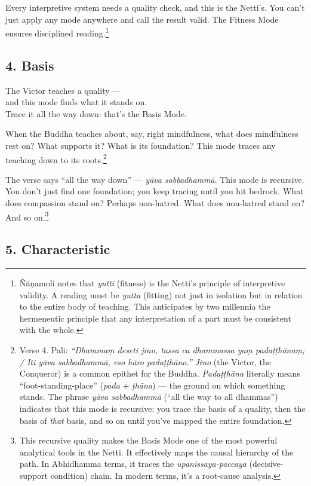 Every interpretive system needs a quality check, and this is the Netti's. You can't just apply any mode anywhere and call the result valid. The Fitness Mode ensures disciplined reading.\footnote{Ñāṇamoli notes that \textit{yutti} (fitness) is the Netti's principle of interpretive validity. A reading must be \textit{yutta} (fitting) not just in isolation but in relation to the entire body of teaching. This anticipates by two millennia the hermeneutic principle that any interpretation of a part must be consistent with the whole.}

\subsection*{4. Basis}

\begin{versebox}
The Victor teaches a quality ---\\
and this mode finds what it stands on.\\
Trace it all the way down: that's the Basis Mode.
\end{versebox}

When the Buddha teaches about, say, right mindfulness, what does mindfulness rest on? What supports it? What is its foundation? This mode traces any teaching down to its roots.\footnote{Verse 4. Pali: \textit{``Dhammaṃ deseti jino, tassa ca dhammassa yaṃ padaṭṭhānaṃ; / Iti yāva sabbadhammā, eso hāro padaṭṭhāno.''} \textit{Jino} (the Victor, the Conqueror) is a common epithet for the Buddha. \textit{Padaṭṭhāna} literally means ``foot-standing-place'' (\textit{pada} + \textit{ṭhāna}) --- the ground on which something stands. The phrase \textit{yāva sabbadhammā} (``all the way to all dhammas'') indicates that this mode is recursive: you trace the basis of a quality, then the basis of \textit{that} basis, and so on until you've mapped the entire foundation.}

The verse says ``all the way down'' --- \textit{yāva sabbadhammā}. This mode is recursive. You don't just find one foundation; you keep tracing until you hit bedrock. What does compassion stand on? Perhaps non-hatred. What does non-hatred stand on? And so on.\footnote{This recursive quality makes the Basis Mode one of the most powerful analytical tools in the Netti. It effectively maps the causal hierarchy of the path. In Abhidhamma terms, it traces the \textit{upanissaya-paccaya} (decisive-support condition) chain. In modern terms, it's a root-cause analysis.}

\subsection*{5. Characteristic}

